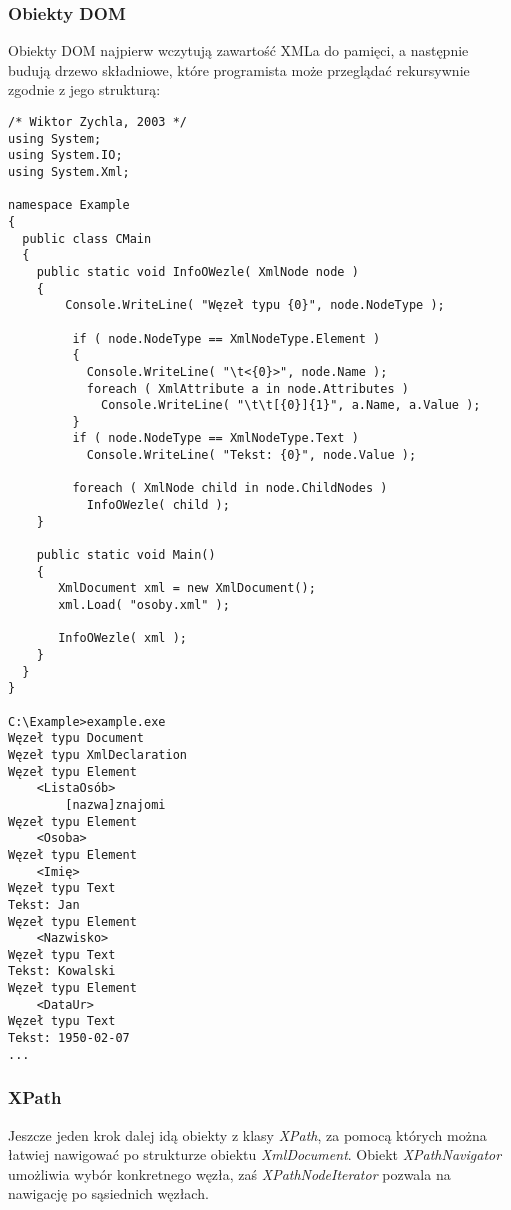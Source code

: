 \subsubsection{Obiekty DOM}

Obiekty DOM najpierw wczytują zawartość XMLa do pamięci, a następnie budują drzewo
składniowe, które programista może przeglądać rekursywnie zgodnie z jego strukturą:

\begin{scriptsize}
\begin{verbatim}
/* Wiktor Zychla, 2003 */
using System;
using System.IO;
using System.Xml;

namespace Example
{
  public class CMain
  {   
    public static void InfoOWezle( XmlNode node )
    {
        Console.WriteLine( "Węzeł typu {0}", node.NodeType );

         if ( node.NodeType == XmlNodeType.Element )
         {
           Console.WriteLine( "\t<{0}>", node.Name );
           foreach ( XmlAttribute a in node.Attributes )
             Console.WriteLine( "\t\t[{0}]{1}", a.Name, a.Value );                         
         }  
         if ( node.NodeType == XmlNodeType.Text )
           Console.WriteLine( "Tekst: {0}", node.Value );    

         foreach ( XmlNode child in node.ChildNodes )
           InfoOWezle( child );
    }

    public static void Main()
    {
       XmlDocument xml = new XmlDocument();
       xml.Load( "osoby.xml" );

       InfoOWezle( xml );
    }
  }
}

C:\Example>example.exe
Węzeł typu Document
Węzeł typu XmlDeclaration
Węzeł typu Element
	<ListaOsób>
		[nazwa]znajomi
Węzeł typu Element
	<Osoba>
Węzeł typu Element
	<Imię>
Węzeł typu Text
Tekst: Jan
Węzeł typu Element
	<Nazwisko>
Węzeł typu Text
Tekst: Kowalski
Węzeł typu Element
	<DataUr>
Węzeł typu Text
Tekst: 1950-02-07
...
\end{verbatim}
\end{scriptsize}

\subsubsection{XPath}

Jeszcze jeden krok dalej idą obiekty z klasy {\em XPath}, za pomocą których można łatwiej
nawigować po strukturze obiektu {\em XmlDocument}. Obiekt {\em XPathNavigator} umożliwia
wybór konkretnego węzła, zaś {\em XPathNodeIterator} pozwala na nawigację po sąsiednich węzłach.

